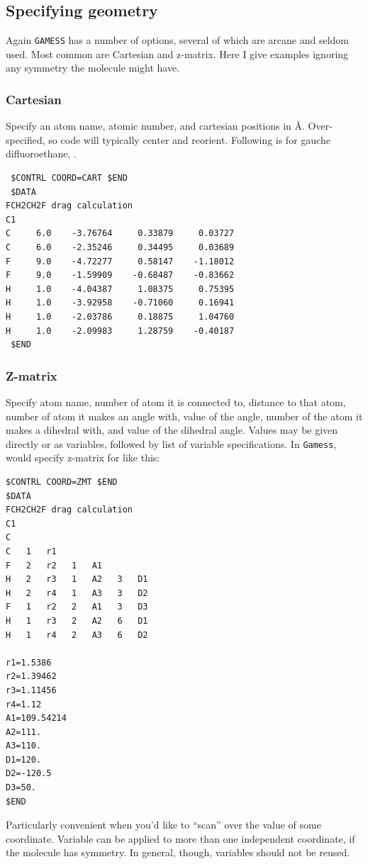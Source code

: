 \documentclass[11pt]{article}
\begin{document}
\subsection{Specifying geometry}
\label{sec:orge289101}
Again \texttt{GAMESS} has a number of options, several of which are arcane and seldom used.  Most common are Cartesian and z-matrix.  Here I give examples ignoring any symmetry the molecule might have.
\subsubsection{Cartesian}
\label{sec:org3fdaebe}
Specify an atom name, atomic number, and cartesian positions in \AA{}.  Over-specified, so code will typically center and reorient.  Following is for gauche difluoroethane, .
\begin{verbatim}
 $CONTRL COORD=CART $END
 $DATA
FCH2CH2F drag calculation
C1
C     6.0    -3.76764     0.33879     0.03727
C     6.0    -2.35246     0.34495     0.03689
F     9.0    -4.72277     0.58147    -1.18012
F     9.0    -1.59909    -0.68487    -0.83662
H     1.0    -4.04387     1.08375     0.75395
H     1.0    -3.92958    -0.71060     0.16941
H     1.0    -2.03786     0.18875     1.04760
H     1.0    -2.09983     1.28759    -0.40187
 $END
\end{verbatim}

\subsubsection{Z-matrix}
\label{sec:org6733314}
Specify atom name, number of atom it is connected to, distance to that atom, number of atom it makes an angle with, value of the angle, number of the atom it makes a dihedral with, and value of the dihedral angle.  Values may be given directly or as variables, followed by list of variable specifications.  In \texttt{Gamess}, would specify z-matrix for  like this:
\begin{verbatim}
$CONTRL COORD=ZMT $END
$DATA
FCH2CH2F drag calculation
C1
C
C   1   r1
F   2   r2   1   A1
H   2   r3   1   A2   3   D1
H   2   r4   1   A3   3   D2
F   1   r2   2   A1   3   D3
H   1   r3   2   A2   6   D1
H   1   r4   2   A3   6   D2

r1=1.5386
r2=1.39462
r3=1.11456
r4=1.12
A1=109.54214
A2=111.
A3=110.
D1=120.
D2=-120.5
D3=50.
$END
\end{verbatim}
Particularly convenient when you'd like to ``scan'' over the value of some coordinate.  Variable can be applied to more than one independent coordinate, if the molecule has symmetry.  In general, though, variables should not be reused.
\end{document}
